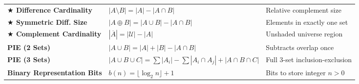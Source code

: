 \documentclass[11pt,a4paper]{article}
\begin{document}
\begin{notebox}
\begin{tabularx}{\linewidth}{@{}l X l@{}}
\textbf{\color{gold!90!black}$\bigstar$ Difference Cardinality} & $|A \setminus B| = |A| - |A \cap B|$ & Relative complement size \\
\textbf{\color{gold!90!black}$\bigstar$ Symmetric Diff. Size} & $|A \oplus B| = |A \cup B| - |A \cap B|$ & Elements in exactly one set \\
\textbf{\color{gold!90!black}$\bigstar$ Complement Cardinality} & $|\overline{A}| = |\mathcal{U}| - |A|$ & Unshaded universe region \\
\textbf{PIE (2 Sets)} & $|A \cup B| = |A| + |B| - |A \cap B|$ & Subtracts overlap once \\
\textbf{PIE (3 Sets)} & $|A \cup B \cup C| = \sum |A_i| - \sum |A_i \cap A_j| + |A \cap B \cap C|$ & Full 3-set inclusion-exclusion \\
\textbf{Binary Representation Bits} & $b(n) = \lfloor \log_2 n \rfloor + 1$ & Bits to store integer $n > 0$ \\
\bottomrule
\end{tabularx}
\end{notebox}

\vspace{-4pt}
\end{document}
